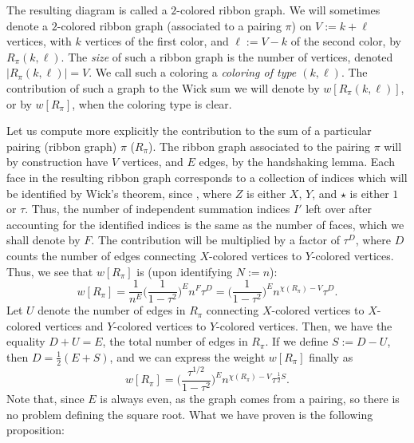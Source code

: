 \documentclass[10pt,a4paper]{amsart}
\numberwithin{equation}{section}
\begin{document}
The resulting diagram is called a $2$-colored ribbon graph. We will sometimes denote a $2$-colored ribbon graph (associated to a pairing $\pi$)
on $V:= k+\ell$ vertices, with $k$ vertices of the first color, and $\ell := V-k$ of the second color, by $R_{\pi}(k,\ell)$. The \textit{size} of such a ribbon graph is the number of vertices, denoted $|R_{\pi}(k,\ell)| = V$. We call such a coloring a \textit{coloring of type $(k,\ell)$}.
The contribution of such a graph to the Wick sum we will denote by $w[R_{\pi}(k,\ell)]$, or by $w[R_{\pi}]$, when the coloring type is
clear.

Let us compute more explicitly the contribution to the sum of a particular pairing (ribbon graph) $\pi$ ($R_{\pi}$).
The ribbon graph associated to the pairing $\pi$ will by construction have $V$ vertices, and $E$ edges, by the handshaking lemma.
Each face in the resulting ribbon graph corresponds to a collection of indices which will be identified by Wick's theorem, since , where $Z$ is either $X$, $Y$, and $\star$ is either $1$ or $\tau$. Thus,
the number of independent summation indices $I'$ left over after accounting for the identified indices is the same as the number of faces, which
we shall denote by $F$. The contribution will be multiplied by a factor of $\tau^D$, where $D$ counts
the number of edges connecting $X$-colored vertices to $Y$-colored vertices. Thus, we see that $w[R_{\pi}]$ is (upon identifying
$N := n$):
 \begin{equation*}
 w[R_{\pi}] = \frac{1}{n^E} \biggl(\frac{1}{1-\tau^2}\biggr)^E n^F \tau^D = \biggl(\frac{1}{1-\tau^2}\biggr)^E n^{\chi(R_{\pi}) -V} \tau^D.
 \end{equation*}
Let $U$ denote the number of edges in $R_{\pi}$ connecting $X$-colored vertices to $X$-colored vertices and $Y$-colored vertices to
$Y$-colored vertices.
Then, we have the equality $D+U = E$, the total number of edges in $R_{\pi}$. If we define $S := D - U$, then $D = \frac{1}{2}(E+S)$, and
we can express the weight $w[R_{\pi}]$ finally as
 \begin{equation}\label{C2:colored-weight-expression}
 w[R_{\pi}] = \biggl(\frac{\tau^{1/2}}{1-\tau^2}\biggr)^E n^{\chi(R_{\pi}) -V}\tau^{\frac{1}{2}S}.
 \end{equation}
Note that, since $E$ is always even, as the graph comes from a pairing, so there is no problem defining the square root.
What we have proven is the following proposition:
\end{document}
